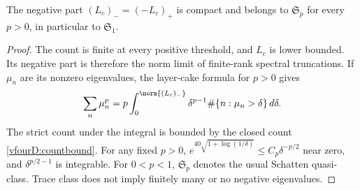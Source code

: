 \begin{corollary}\label{vfourD:schatten}
The negative part $(L_c)_-=(-L_c)_+$ is compact and belongs to $\mathfrak S_p$ for every $p>0$, in particular to $\mathfrak S_1$.
\end{corollary}
\begin{proof}
The count is finite at every positive threshold, and $L_c$ is lower bounded. Its negative part is therefore the norm limit of finite-rank spectral truncations. If $\mu_n$ are its nonzero eigenvalues, the layer-cake formula for $p>0$ gives
\[\sum_n\mu_n^p=p\int_0^{\norm{(L_c)_-}}\delta^{p-1}\#\{n:\mu_n>\delta\}\,d\delta.
\]
The strict count under the integral is bounded by the closed count \eqref{vfourD:countbound}. For any fixed $p>0$, $e^{40\sqrt{1+\log(1/\delta)}}\le C_p\delta^{-p/2}$ near zero, and $\delta^{p/2-1}$ is integrable. For $0<p<1$, $\mathfrak S_p$ denotes the usual Schatten quasi-class. Trace class does not imply finitely many or no negative eigenvalues.
\end{proof}

